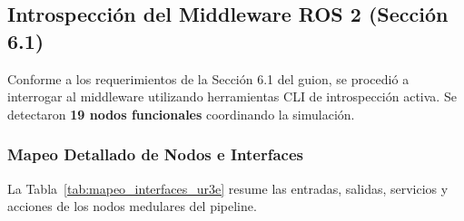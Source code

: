 \documentclass[11pt,a4paper]{article}
\begin{document}
\subsection{Introspección del Middleware ROS 2 (Sección 6.1)}

Conforme a los requerimientos de la Sección 6.1 del guion, se procedió a interrogar al middleware utilizando herramientas CLI de introspección activa. Se detectaron \textbf{19 nodos funcionales} coordinando la simulación.

\subsubsection{Mapeo Detallado de Nodos e Interfaces}
La Tabla~\ref{tab:mapeo_interfaces_ur3e} resume las entradas, salidas, servicios y acciones de los nodos medulares del pipeline.
\end{document}
